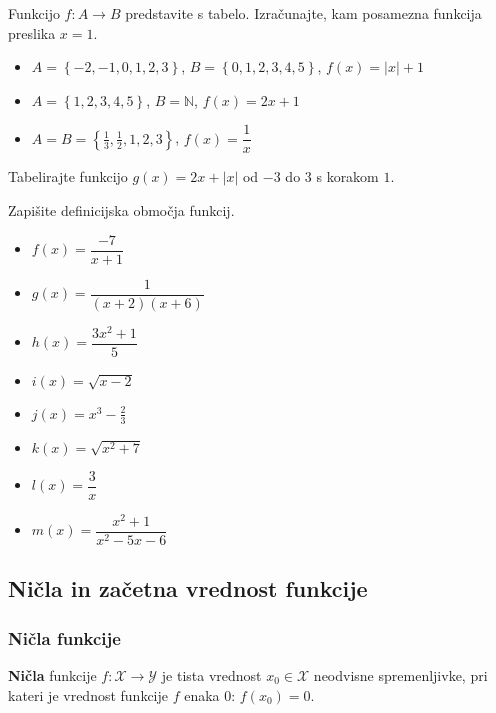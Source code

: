 
    \begin{naloga}
        Funkcijo $f: A\to B$ predstavite s tabelo. Izračunajte, kam posamezna funkcija preslika $x=1$.
        \begin{itemize}
            \item $A=\left\{-2, -1, 0, 1, 2, 3\right\}$, $B=\left\{0, 1, 2, 3, 4, 5\right\}$, $f(x)=|x|+1$ 
            \item $A=\left\{1, 2, 3, 4, 5\right\}$, $B=\mathbb{N}$, $f(x)=2x+1$ 
            \item $A=B=\left\{\frac{1}{3}, \frac{1}{2}, 1, 2, 3\right\}$, $f(x)=\dfrac{1}{x}$ 
        \end{itemize} 
    \end{naloga}
   
    \begin{naloga}
        Tabelirajte funkcijo $g(x)=2x+|x|$ od $-3$ do $3$ s korakom $1$. 
    \end{naloga}


    \begin{naloga}
        Zapišite definicijska območja funkcij.
            \begin{itemize}
                \item $f(x)=\dfrac{-7}{x+1}$ 
                \item $g(x)=\dfrac{1}{(x+2)(x+6)}$ 
                \item $h(x)=\dfrac{3x^2+1}{5}$ 
                \item $i(x)=\sqrt{x-2}$ 
                \item $j(x)=x^3-\frac{2}{3}$ 
                \item $k(x)=\sqrt{x^2+7}$ 
                \item $l(x)=\dfrac{3}{x}$ 
                \item $m(x)=\dfrac{x^2+1}{x^2-5x-6}$ 
            \end{itemize}

    \end{naloga}





    \subsection*{Ničla in začetna vrednost funkcije}

    \subsubsection*{Ničla funkcije}
        \textbf{Ničla} funkcije $f:\mathcal{X}\to\mathcal{Y}$ je tista vrednost $x_0\in\mathcal{X}$ neodvisne spremenljivke, 
        pri kateri je vrednost funkcije $f$ enaka $0$: $f(x_0)=0$.

